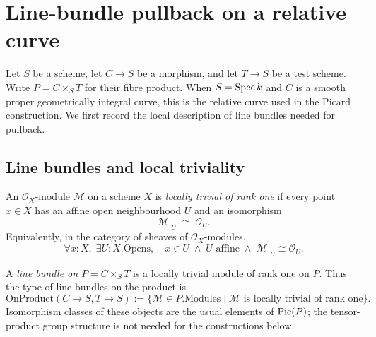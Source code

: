 \chapter{Line-bundle pullback on a relative curve}
\label{chap:Picard_LineBundlePullback}

Let $S$ be a scheme, let $C \to S$ be a morphism, and let $T \to S$ be a
test scheme.  Write $P=C\times_S T$ for their fibre product.  When $S=\operatorname{Spec} k$
and $C$ is a smooth proper geometrically integral curve, this is the relative
curve used in the Picard construction.  We first record the local description
of line bundles needed for pullback.

\section{Line bundles and local triviality}
\label{sec:lbp_line_bundle}

\begin{definition}\leanok
  \label{def:IsLocallyTrivial}
  An $\mathcal O_X$-module $\mathcal M$ on a scheme $X$ is \emph{locally
  trivial of rank one} if every point $x\in X$ has an affine open
  neighbourhood $U$ and an isomorphism
  \[
    \mathcal M|_U \;\cong\; \mathcal O_U.
  \]
  Equivalently, in the category of sheaves of $\mathcal O_X$-modules,
  \[
    \forall x:X,\;\exists U:X.\mathrm{Opens},\quad
    x\in U\;\wedge\;U\text{ affine}\;\wedge\;
    \mathcal M|_U\cong\mathcal O_U.
  \]
\end{definition}

\begin{definition}\leanok
  \label{def:line_bundle_on_product}
  A \emph{line bundle on $P=C\times_S T$} is a locally trivial module of rank
  one on $P$.  Thus the type of line bundles on the product is
  \[
    \mathrm{OnProduct}(C\to S,T\to S)
    :=\{\mathcal M\in P.\mathrm{Modules}\mid
          \mathcal M\text{ is locally trivial of rank one}\}.
  \]
  Isomorphism classes of these objects are the usual elements of
  $\operatorname{Pic}(P)$; the tensor-product group structure is not needed for the
  constructions below.
\end{definition}

